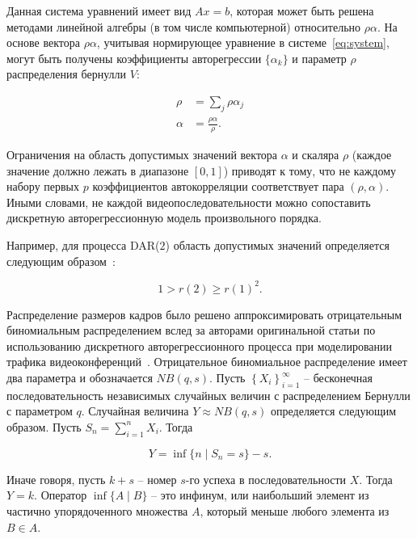 Данная система уравнений имеет вид $Ax = b$, которая может быть решена методами
линейной алгебры (в том числе компьютерной) относительно $\rho\alpha$.
На основе вектора $\rho\alpha$, учитывая нормирующее уравнение в системе~\ref{eq:system},
могут быть получены коэффициенты авторегрессии $\{\alpha_k\}$ и параметр $\rho$ распределения
бернулли $V$:

\begin{equation}
    \begin{aligned}
        \rho &= \sum_j \rho\alpha_j \\
        \alpha &= \frac{\rho\alpha}{\rho}.
    \end{aligned}
\end{equation}

Ограничения на область допустимых значений вектора
$\alpha$ и скаляра $\rho$ (каждое значение должно
лежать в диапазоне $[0, 1]$) приводят к тому, что
не каждому набору первых $p$ коэффициентов автокорреляции
соответствует пара $(\rho, \alpha)$. Иными словами,
не каждой видеопоследовательности можно сопоставить
дискретную авторегрессионную модель произвольного порядка.

Например, для процесса DAR($2$) область допустимых
значений определяется следующим образом~\cite{mixtures}:

\begin{equation}
    1 > r(2) \geq r(1)^2.
\end{equation}

Распределение размеров кадров было решено аппроксимировать
отрицательным биномиальным распределением вслед за авторами
оригинальной статьи по использованию дискретного авторегрессионного
процесса при моделировании трафика видеоконференций~\cite{heymanATM}.
Отрицательное биномиальное распределение имеет два параметра
и обозначается $NB(q,s)$.
Пусть $\left\{ X_i \right\}_{i=1}^\infty$ --
бесконечная последовательность независимых случайных
величин с распределением Бернулли с параметром $q$.
Случайная величина $Y\approx NB(q,s)$ определяется следующим
образом. Пусть $S_n = \sum_{i=1}^n X_i$. Тогда

\begin{equation}
    Y = \inf \{ n \mid S_n = s \} - s.
\end{equation}

Иначе говоря, пусть $k + s$ -- номер $s$-го успеха в
последовательности $X$. Тогда $Y = k$. Оператор $\inf \{ A \mid B \}$ --
это инфинум, или наибольший элемент из частично упорядоченного множества
$A$, который меньше любого элемента из $B \in A$.

